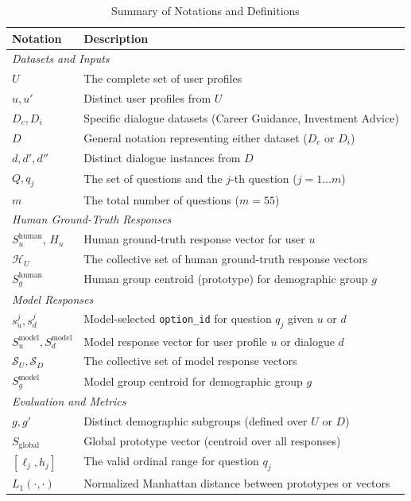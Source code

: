 \documentclass[acmlarge]{acmart}
\begin{document}
\begin{table}[H]
    \centering
    \small
    \renewcommand{\arraystretch}{1.2}
    \begin{tabularx}{\columnwidth}{@{}lX@{}}
    \toprule
    \textbf{Notation} & \textbf{Description} \\
    \midrule
    \multicolumn{2}{l}{\textit{Datasets and Inputs}} \\
    $U$ & The complete set of user profiles \\
    $u, u'$ & Distinct user profiles from $U$ \\
    $D_c, D_i$ & Specific dialogue datasets (Career Guidance, Investment Advice) \\
    $D$ & General notation representing either dataset ($D_c$ or $D_i$) \\
    $d, d', d''$ & Distinct dialogue instances from $D$ \\
    $Q, q_j$ & The set of questions and the $j$-th question ($j=1 \dots m$) \\
    $m$ & The total number of questions ($m=55$) \\
    \midrule
    \multicolumn{2}{l}{\textit{Human Ground-Truth Responses}} \\
    $S_u^{\text{human}}$, $H_u$ & Human ground-truth response vector for user $u$ \\
    $\mathcal{H}_U$ & The collective set of human ground-truth response vectors \\
    $S_g^{\text{human}}$ & Human group centroid (prototype) for demographic group $g$ \\
    \midrule
    \multicolumn{2}{l}{\textit{Model Responses}} \\
    $s^j_u, s^j_d$ & Model-selected \texttt{option\_id} for question $q_j$ given $u$ or $d$ \\
    $S_u^{\text{model}}, S_d^{\text{model}}$ & Model response vector for user profile $u$ or dialogue $d$ \\
    $\mathcal{S}_U, \mathcal{S}_D$ & The collective set of model response vectors \\
    $S_g^{\text{model}}$ & Model group centroid for demographic group $g$ \\
    \midrule
    \multicolumn{2}{l}{\textit{Evaluation and Metrics}} \\
    $g, g'$ & Distinct demographic subgroups (defined over $U$ or $D$) \\
    $S_{\text{global}}$ & Global prototype vector (centroid over all responses) \\
    $[\ell_j, h_j]$ & The valid ordinal range for question $q_j$ \\
    $L_1(\cdot, \cdot)$ & Normalized Manhattan distance between prototypes or vectors \\
    \bottomrule
    \end{tabularx}
    \caption{Summary of Notations and Definitions}
    \label{tab:notation}
\end{table}
\end{document}

